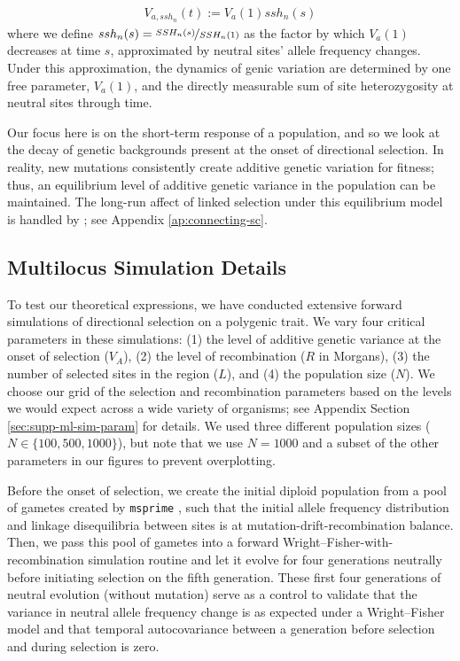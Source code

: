\documentclass[11pt]{article}
\begin{document}
\begin{align}
  V_{a,ssh_n}(t) := V_a(1) ssh_n(s)
\end{align}
%
where we define $ssh_n(s) = \nicefrac{SSH_n(s)}{SSH_n(1)}$ as the factor by
which $V_a(1)$ decreases at time $s$, approximated by neutral sites' allele
frequency changes. Under this approximation, the dynamics of genic variation
are determined by one free parameter, $V_a(1)$, and the directly measurable sum of
site heterozygosity at neutral sites through time. 

Our focus here is on the short-term response of a population, and so we look at
the decay of genetic backgrounds present at the onset of directional selection.
In reality, new mutations consistently create additive genetic variation for
fitness; thus, an equilibrium level of additive genetic variance in the
population can be maintained. The long-run affect of linked selection under
this equilibrium model is handled by
\textcite{Santiago1995-hx,Santiago1998-bs}; see Appendix
\ref{ap:connecting-sc}.

\subsection{Multilocus Simulation Details}
\label{sec:ml-sim}

To test our theoretical expressions, we have conducted extensive forward
simulations of directional selection on a polygenic trait. We vary four
critical parameters in these simulations: (1) the level of additive genetic
variance at the onset of selection ($V_A$), (2) the level of recombination ($R$
in Morgans), (3) the number of selected sites in the region ($L$), and (4) the
population size ($N$). We choose our grid of the selection and recombination
parameters based on the levels we would expect across a wide variety of
organisms; see Appendix Section \ref{sec:supp-ml-sim-param} for details. We
used three different population sizes ($N \in \{100, 500, 1000\}$), but note
that we use $N=1000$ and a subset of the other parameters in our figures to
prevent overplotting.


Before the onset of selection, we create the initial diploid population from a
pool of gametes created by \texttt{msprime} \parencite{Kelleher2016-oi}, such
that the initial allele frequency distribution and linkage disequilibria
between sites is at mutation-drift-recombination balance. Then, we pass this
pool of gametes into a forward Wright--Fisher-with-recombination simulation
routine and let it evolve for four generations neutrally before initiating
selection on the fifth generation.  These first four generations of neutral
evolution (without mutation) serve as a control to validate that the variance
in neutral allele frequency change is as expected under a Wright--Fisher model
and that temporal autocovariance between a generation before selection and
during selection is zero.
\end{document}
